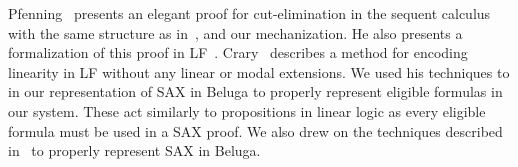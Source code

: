 Pfenning~\cite{Pfenning2000StructuralCutElimination} presents an elegant proof
for cut-elimination in the sequent calculus with the same structure as
in~\cite{DeYoung2020}, and our mechanization. He also presents a formalization
of this proof in
LF~\cite{Pfenning2000StructuralCutElimination}. Crary~\cite{crary2009substructural}
describes a method for encoding linearity in LF without any linear or modal
extensions. We used his techniques to in our representation of SAX in Beluga to
properly represent eligible formulas in our system. These act similarly to
propositions in linear logic as every eligible formula must be used in a SAX
proof. We also drew on the techniques described in~\cite{Sanomech} to properly
represent SAX in Beluga. %
